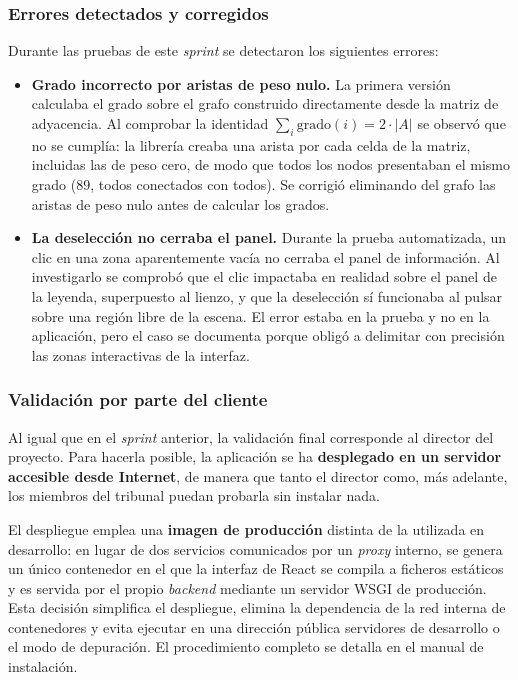 \subsubsection*{Errores detectados y corregidos}

Durante las pruebas de este \textit{sprint} se detectaron los siguientes errores:

\begin{itemize}
	\item \textbf{Grado incorrecto por aristas de peso nulo.} La primera versión calculaba el grado
		sobre el grafo construido directamente desde la matriz de adyacencia. Al comprobar la identidad
		$\sum_i \text{grado}(i) = 2 \cdot |A|$ se observó que no se cumplía: la librería creaba una
		arista por cada celda de la matriz, incluidas las de peso cero, de modo que todos los nodos
		presentaban el mismo grado (89, todos conectados con todos). Se corrigió eliminando del grafo
		las aristas de peso nulo antes de calcular los grados.
	\item \textbf{La deselección no cerraba el panel.} Durante la prueba automatizada, un clic en una
		zona aparentemente vacía no cerraba el panel de información. Al investigarlo se comprobó que el
		clic impactaba en realidad sobre el panel de la leyenda, superpuesto al lienzo, y que la
		deselección sí funcionaba al pulsar sobre una región libre de la escena. El error estaba en la
		prueba y no en la aplicación, pero el caso se documenta porque obligó a delimitar con precisión
		las zonas interactivas de la interfaz.
\end{itemize}

\subsubsection*{Validación por parte del cliente}

Al igual que en el \textit{sprint} anterior, la validación final corresponde al director del proyecto.
Para hacerla posible, la aplicación se ha \textbf{desplegado en un servidor accesible desde Internet},
de manera que tanto el director como, más adelante, los miembros del tribunal puedan probarla sin
instalar nada.

El despliegue emplea una \textbf{imagen de producción} distinta de la utilizada en desarrollo: en
lugar de dos servicios comunicados por un \textit{proxy} interno, se genera un único contenedor en el
que la interfaz de React se compila a ficheros estáticos y es servida por el propio \textit{backend}
mediante un servidor WSGI de producción. Esta decisión simplifica el despliegue, elimina la
dependencia de la red interna de contenedores y evita ejecutar en una dirección pública servidores
de desarrollo o el modo de depuración. El procedimiento completo se detalla en el manual de
instalación.

